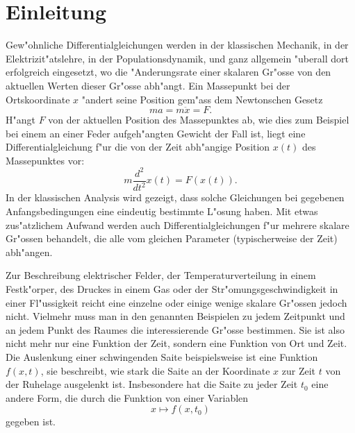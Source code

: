 %
%
%
\chapter*{Einleitung}
Gew"ohnliche Differentialgleichungen werden in der klassischen Mechanik,
in der Elektrizit"atslehre, in der Populationsdynamik, und ganz 
allgemein "uberall dort erfolgreich eingesetzt, wo die
"Anderungsrate einer skalaren Gr"osse von den aktuellen Werten dieser Gr"osse
abh"angt.
Ein Massepunkt bei der Ortskoordinate $x$ "andert seine Position
gem"ass dem Newtonschen Gesetz
\[
ma=m\ddot x=F.
\]
H"angt $F$ von der aktuellen Position des Massepunktes ab, wie dies zum
Beispiel bei einem an einer Feder aufgeh"angten Gewicht der Fall ist,
liegt eine Differentialgleichung f"ur die von der Zeit abh"angige
Position $x(t)$ des Massepunktes vor:
\[
m\frac{d^2}{dt^2}x(t)=F(x(t)).
\]
In der klassischen Analysis wird gezeigt, dass solche Gleichungen bei
gegebenen Anfangsbedingungen eine eindeutig bestimmte L"osung haben.
Mit etwas zus"atzlichem Aufwand werden auch Differentialgleichungen
f"ur mehrere skalare Gr"ossen behandelt, die alle vom gleichen Parameter
(typischerweise der Zeit) abh"angen.

Zur Beschreibung elektrischer Felder, der Temperaturverteilung in
einem Fest\-k"orper, des Druckes in einem Gas oder der Str"omungsgeschwindigkeit
in einer Fl"ussigkeit reicht eine einzelne oder einige wenige skalare
Gr"ossen jedoch nicht. Vielmehr muss man in den genannten Beispielen
zu jedem Zeitpunkt und an jedem Punkt des Raumes die interessierende Gr"osse
bestimmen. Sie ist also nicht mehr nur eine Funktion der Zeit, sondern eine
Funktion von Ort und Zeit.
Die Auslenkung einer schwingenden Saite
beispielsweise ist eine Funktion $f(x,t)$, sie beschreibt, wie stark
die Saite an der Koordinate $x$ zur Zeit $t$ von der Ruhelage ausgelenkt ist.
Insbesondere hat die Saite zu jeder Zeit $t_0$ eine andere Form, die durch
die Funktion von einer Variablen
\[
x\mapsto f(x,t_0)
\]
gegeben ist.

